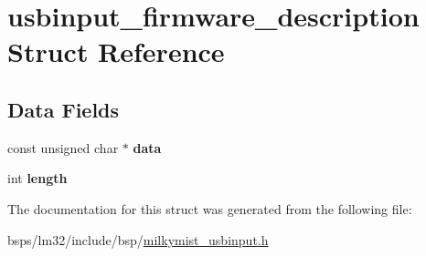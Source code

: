 \hypertarget{structusbinput__firmware__description}{}\section{usbinput\+\_\+firmware\+\_\+description Struct Reference}
\label{structusbinput__firmware__description}
\subsection*{Data Fields}
\begin{DoxyCompactItemize}
\item 
const unsigned char $\ast$ {\bfseries data}
\item 
int {\bfseries length}
\end{DoxyCompactItemize}


The documentation for this struct was generated from the following file\+:\begin{DoxyCompactItemize}
\item 
bsps/lm32/include/bsp/\mbox{\hyperlink{milkymist__usbinput_8h}{milkymist\+\_\+usbinput.\+h}}\end{DoxyCompactItemize}
